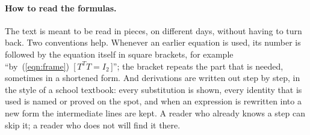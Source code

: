 \documentclass{birkjour}
\numberwithin{equation}{section}
\begin{document}
\paragraph{How to read the formulas.} The text is meant to be read in pieces, on different days, without having to turn back. Two conventions help. Whenever an earlier equation is used, its number is followed by the equation itself in square brackets, for example ``by~(\ref{eqn:frame})~[\,$T^TT = I_2$\,]''; the bracket repeats the part that is needed, sometimes in a shortened form. And derivations are written out step by step, in the style of a school textbook: every substitution is shown, every identity that is used is named or proved on the spot, and when an expression is rewritten into a new form the intermediate lines are kept. A reader who already knows a step can skip it; a reader who does not will find it there.











\end{document}
